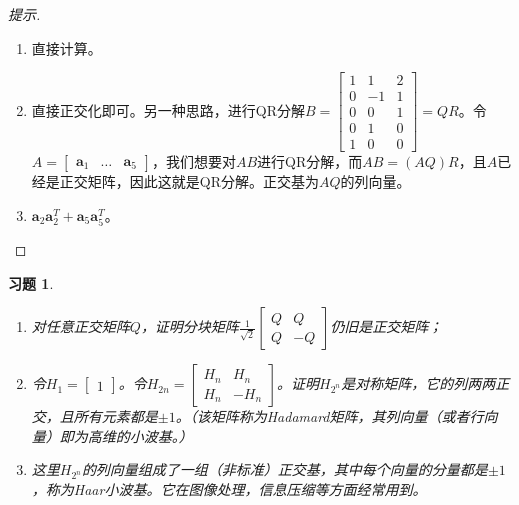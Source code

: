 \documentclass[UTF8]{ctexart}
\newtheorem{ex}[thm]{习题}
\begin{document}
\begin{proof}[提示]
\begin{enumerate}
\item 直接计算。
\item 直接正交化即可。另一种思路，进行QR分解$B=\begin{bmatrix}1&1&2\\0&-1&1\\0&0&1\\0&1&0\\1&0&0\end{bmatrix}=QR$。令$A=\begin{bmatrix}\bm a_1&\dots&\bm a_5\end{bmatrix}$，我们想要对$AB$进行QR分解，而$AB=(AQ)R$，且$A$已经是正交矩阵，因此这就是QR分解。正交基为$AQ$的列向量。
\item $\bm a_2\bm a_2^T+\bm a_5\bm a_5^T$。
\end{enumerate}
\end{proof}





\begin{ex}
\begin{enumerate}
\item 对任意正交矩阵$Q$，证明分块矩阵$\frac{1}{\sqrt{2}}\begin{bmatrix}Q&Q\\Q&-Q\end{bmatrix}$仍旧是正交矩阵；
\item 令$H_1=\begin{bmatrix}1\end{bmatrix}$。令$H_{2n}=\begin{bmatrix}H_n&H_n\\H_n&-H_n\end{bmatrix}$。证明$H_{2^n}$是对称矩阵，它的列两两正交，且所有元素都是$\pm 1$。（该矩阵称为Hadamard矩阵，其列向量（或者行向量）即为高维的小波基。）
\item[注记：] 这里$H_{2^n}$的列向量组成了一组（非标准）正交基，其中每个向量的分量都是$\pm 1$，称为Haar小波基。它在图像处理，信息压缩等方面经常用到。
\end{enumerate}
\end{ex}
\end{document}
